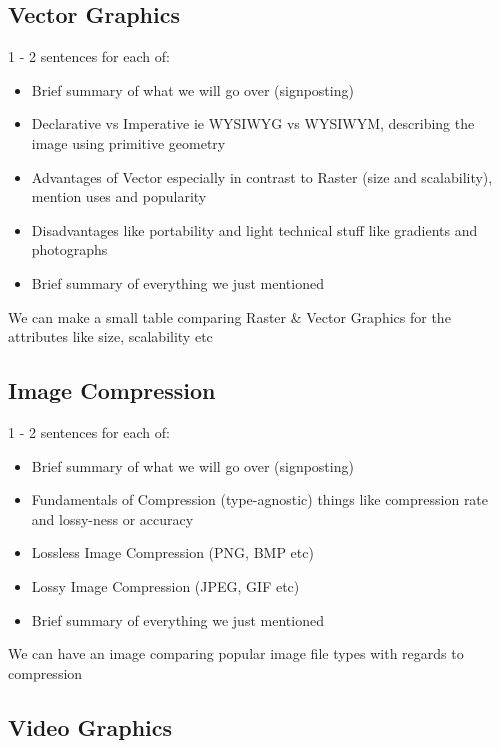 \documentclass[12pt]{article}
\begin{document}
    \subsection{Vector Graphics}\label{subsec:vector-graphics}

    1 - 2 sentences for each of:

    \begin{itemize}
        \item Brief summary of what we will go over (signposting)
        \item Declarative vs Imperative ie WYSIWYG vs WYSIWYM, describing the image using primitive geometry
        \item Advantages of Vector especially in contrast to Raster (size and scalability), mention uses and popularity
        \item Disadvantages like portability and light technical stuff like gradients and photographs
        \item Brief summary of everything we just mentioned
    \end{itemize}

    We can make a small table comparing Raster \& Vector Graphics for the attributes like size, scalability etc

    \subsection{Image Compression}\label{subsec:image-compression}

    1 - 2 sentences for each of:

    \begin{itemize}
        \item Brief summary of what we will go over (signposting)
        \item Fundamentals of Compression (type-agnostic) things like compression rate and lossy-ness or accuracy
        \item Lossless Image Compression (PNG, BMP etc)
        \item Lossy Image Compression (JPEG, GIF etc)
        \item Brief summary of everything we just mentioned
    \end{itemize}

    We can have an image comparing popular image file types with regards to compression

    \subsection{Video Graphics}\label{subsec:video-graphics}
\end{document}
